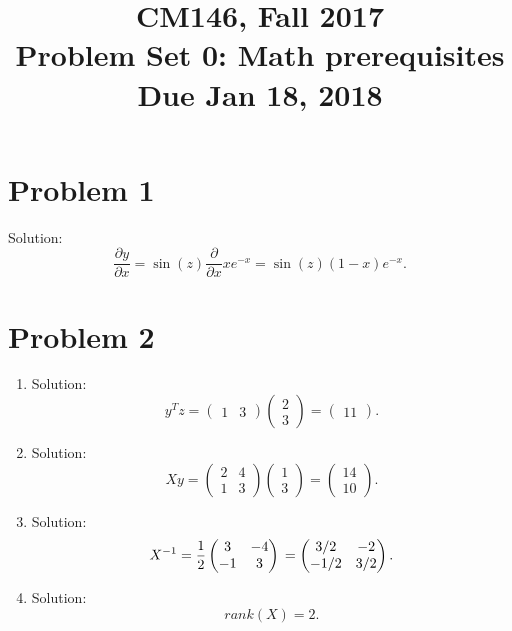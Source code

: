\documentclass[11pt]{article}
\newcommand{\cnum}{CM146}
\newcommand{\ced}{Fall 2017}
\newcommand{\ctitle}[3]{\title{\vspace{-0.5in}\cnum, \ced\\Problem Set #1: #2\\Due #3}}
\begin{document}
\ctitle{0}{Math prerequisites}{Jan 18, 2018}
\author{}
\date{}
\maketitle
\vspace{-0.75in}

\section{Problem 1}
Solution:
\begin{equation*}
\frac{\partial y}{\partial x}
= \sin(z) \frac{\partial}{\partial x} xe^{-x}
= \sin(z) (1 - x) e^{-x}.
\end{equation*}

\newpage
\section{Problem 2}
\begin{enumerate}
\item
Solution:
\begin{equation*}
  y^Tz = \begin{pmatrix}
    1 &3 \end{pmatrix} \begin{pmatrix} 2 \\ 3 \end{pmatrix} = \begin{pmatrix} 11 \end{pmatrix}.
\end{equation*}
\item
Solution:
\begin{equation*}
  Xy = \begin{pmatrix}
    2 &4\\
    1 &3 \end{pmatrix} \begin{pmatrix} 1 \\ 3 \end{pmatrix}
  = \begin{pmatrix} 14 \\ 10 \end{pmatrix}.
\end{equation*}
\item
Solution:
\begin{equation*}
  X^{-1} = \frac{1}{2} \begin{pmatrix} 3 &-4\\ -1 &3 \end{pmatrix}\\
  = \begin{pmatrix} 3/2 &-2\\ -1/2 &3/2 \end{pmatrix}.
\end{equation*}
\item
Solution:
\begin{equation*}
rank(X) = 2.    
\end{equation*}
\end{enumerate}
\newpage
\end{document}
